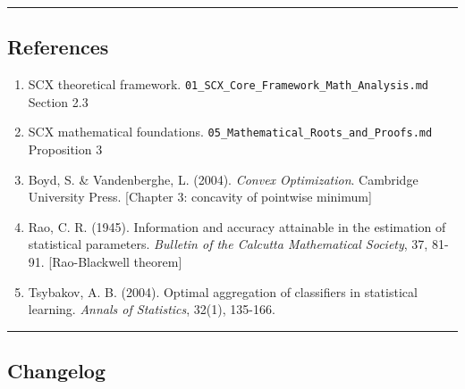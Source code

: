 \documentclass[
  12pt,
]{article}
\providecommand{\tightlist}{%
  \setlength{\itemsep}{0pt}\setlength{\parskip}{0pt}}
\begin{document}
\begin{center}\rule{0.5\linewidth}{0.5pt}\end{center}

\subsection{References}\label{references}

\begin{enumerate}
\def\labelenumi{\arabic{enumi}.}
\tightlist
\item
  SCX theoretical framework. \texttt{01\_SCX\_Core\_Framework\_Math\_Analysis.md}
  Section 2.3
\item
  SCX mathematical foundations. \texttt{05\_Mathematical\_Roots\_and\_Proofs.md}
  Proposition 3
\item
  Boyd, S. \& Vandenberghe, L. (2004). \emph{Convex Optimization}.
  Cambridge University Press. [Chapter 3: concavity of pointwise
  minimum]
\item
  Rao, C. R. (1945). Information and accuracy attainable in the
  estimation of statistical parameters. \emph{Bulletin of the Calcutta
  Mathematical Society}, 37, 81-91. [Rao-Blackwell theorem]
\item
  Tsybakov, A. B. (2004). Optimal aggregation of classifiers in
  statistical learning. \emph{Annals of Statistics}, 32(1), 135-166.
\end{enumerate}

\begin{center}\rule{0.5\linewidth}{0.5pt}\end{center}

\subsection{Changelog}\label{changelog}
\end{document}
